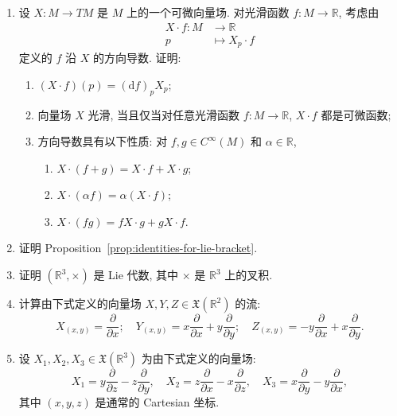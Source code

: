 \begin{RiemannExercise}\label{ex:vector-fields}
\begin{enumerate}[label=(\arabic*),ref=\arabic*,leftmargin=*]
\item\label{ex:directional-derivative-characterization} 设 $X:M\to TM$ 是 $M$ 上的一个可微向量场. 对光滑函数 $f:M\to\mathbb{R}$, 考虑由
\begin{align*}
  X\cdot f:M&\to\mathbb{R}\\
  p&\mapsto X_p\cdot f
\end{align*}
定义的 $f$ 沿 $X$ 的方向导数. 证明:
\begin{enumerate}[label=(\alph*),leftmargin=*]
\item $(X\cdot f)(p)=(\mathrm{d}f)_pX_p$;
\item 向量场 $X$ 光滑, 当且仅当对任意光滑函数 $f:M\to\mathbb{R}$, $X\cdot f$ 都是可微函数;
\item 方向导数具有以下性质: 对 $f,g\in C^\infty(M)$ 和 $\alpha\in\mathbb{R}$,
\begin{enumerate}[label=(\roman*),leftmargin=*]
\item $X\cdot(f+g)=X\cdot f+X\cdot g$;
\item $X\cdot(\alpha f)=\alpha(X\cdot f)$;
\item $X\cdot(fg)=fX\cdot g+gX\cdot f$.
\end{enumerate}
\end{enumerate}
\item\label{ex:prove-lie-bracket-properties} 证明 Proposition~\ref{prop:identities-for-lie-bracket}.
\item\label{ex:cross-product-lie-algebra} 证明 $(\mathbb{R}^3,\times)$ 是 Lie 代数, 其中 $\times$ 是 $\mathbb{R}^3$ 上的叉积.
\item\label{ex:flows-of-three-plane-vector-fields} 计算由下式定义的向量场 $X,Y,Z\in\mathfrak{X}(\mathbb{R}^2)$ 的流:
\[
  X_{(x,y)}=\frac{\partial}{\partial x};\quad
  Y_{(x,y)}=x\frac{\partial}{\partial x}+y\frac{\partial}{\partial y};\quad
  Z_{(x,y)}=-y\frac{\partial}{\partial x}+x\frac{\partial}{\partial y}.
\]
\item\label{ex:rotations-as-vector-field-flows} 设 $X_1,X_2,X_3\in\mathfrak{X}(\mathbb{R}^3)$ 为由下式定义的向量场:
\[
  X_1=y\frac{\partial}{\partial z}-z\frac{\partial}{\partial y},\quad
  X_2=z\frac{\partial}{\partial x}-x\frac{\partial}{\partial z},\quad
  X_3=x\frac{\partial}{\partial y}-y\frac{\partial}{\partial x},
\]
其中 $(x,y,z)$ 是通常的 Cartesian 坐标.
\begin{enumerate}[label=(\alph*),leftmargin=*]

\end{enumerate}
\end{enumerate}
\end{RiemannExercise}
